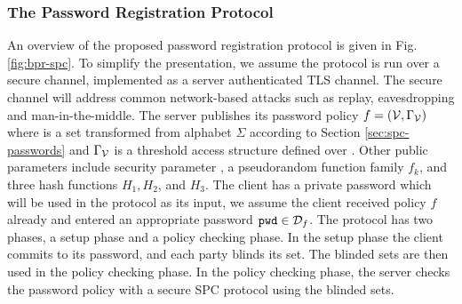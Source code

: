 \subsubsection{The Password Registration Protocol}
An overview of the proposed password registration protocol is given in Fig. \ref{fig:bpr-spc}. 
To simplify the presentation, we assume the protocol is run over a secure channel, \eg implemented as a server authenticated \ac{TLS} channel. 
The secure channel will address common network-based attacks such as replay, eavesdropping and man-in-the-middle. 
The server publishes its password policy $f=(\mathcal{V},\Gamma_\mathcal{V})$ where \ServerSet is a set transformed from alphabet $\Sigma$ according to Section \ref{sec:spc-passwords} and $\Gamma_\mathcal{V}$ is a threshold access structure defined over \ServerSet. 
Other public parameters include security parameter \secpar, a pseudorandom function family $f_k$, and three hash functions $H_1, H_2$, and $H_3$. 
The client has a private password \pwd which will be used in the protocol as its input, \ie we assume the client received policy $f$ already and entered an appropriate password $\mathtt{pwd}\in\mathcal{D}_f$. 
The protocol has two phases, a setup phase and a policy checking phase. 
In the setup phase the client commits to its password, and each party blinds its set. 
The blinded sets are then used in the policy checking phase. In the policy checking phase, the server checks the password policy with a secure \ac{SPC} protocol using the blinded sets.

